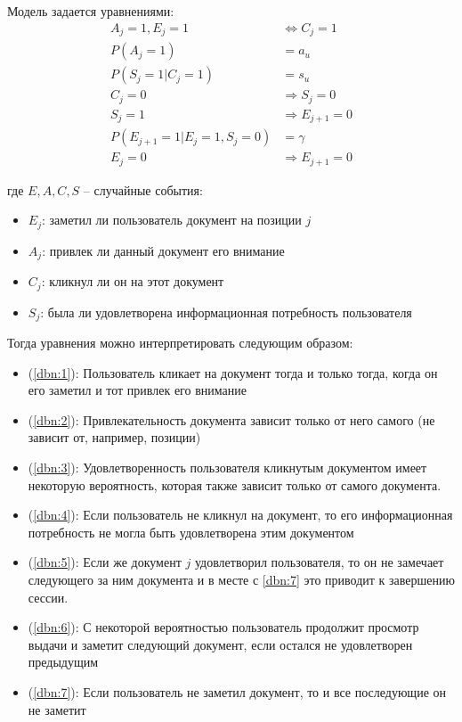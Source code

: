 \documentclass[diploma]{nanolab2015}
\begin{document}
Модель задается уравнениями:
\begin{align}
    A_j = 1, E_j = 1                  & \Leftrightarrow C_j = 1 \label{dbn:1} \\
    P(A_j = 1)                        & = a_u                  \label{dbn:2}  \\
    P(S_j = 1| C_j = 1)               & = s_u                   \label{dbn:3} \\
    C_j = 0                           & \Rightarrow S_j = 0 \label{dbn:4}     \\
    S_j = 1                           & \Rightarrow E_{j+1} = 0 \label{dbn:5} \\
    P(E_{j+1} = 1 | E_j = 1, S_j = 0) & = \gamma                \label{dbn:6} \\
    E_j = 0                           & \Rightarrow E_{j+1} = 0 \label{dbn:7}
\end{align}


где $E, A, C, S$ -- случайные события:
\begin{itemize}
    \item $E_j$: заметил ли пользователь документ на позиции $j$
    \item $A_j$: привлек ли данный документ его внимание
    \item $C_j$: кликнул ли он на этот документ
    \item $S_j$: была ли удовлетворена информационная потребность пользователя
\end{itemize}
Тогда уравнения можно интерпретировать следующим образом:
\begin{itemize}
    \item (\ref{dbn:1}): Пользователь кликает на документ тогда и только тогда, когда он его заметил и тот привлек его внимание
    \item (\ref{dbn:2}): Привлекательность документа зависит только от него самого (не зависит от, например, позиции)
    \item (\ref{dbn:3}): Удовлетворенность пользователя кликнутым документом имеет некоторую вероятность, которая также зависит только от самого документа.
    \item (\ref{dbn:4}): Если пользователь не кликнул на документ, то его информационная потребность не могла быть удовлетворена этим документом
    \item (\ref{dbn:5}): Если же документ $j$ удовлетворил пользователя, то он не замечает следующего за ним документа и в месте с \ref{dbn:7} это приводит к завершению сессии.
    \item (\ref{dbn:6}): С некоторой вероятностью пользователь продолжит просмотр выдачи и заметит следующий документ, если остался не удовлетворен предыдущим
    \item (\ref{dbn:7}): Если пользователь не заметил документ, то и все последующие он не заметит
\end{itemize}
\end{document}
